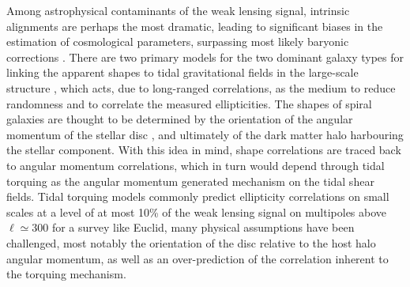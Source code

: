 \documentclass[a4paper,fleqn,usenatbib]{mnras}
\begin{document}
Among astrophysical contaminants of the weak lensing signal, intrinsic alignments \citep{jing_intrinsic_2002, mackey_theoretical_2002, heymans_weak_2004, altay_influence_2006, kirk_impact_2010, massey_origins_2013, kitching_limits_2016} are perhaps the most dramatic, leading to significant biases in the estimation of cosmological parameters, surpassing most likely baryonic corrections \citep{white_baryons_2004, semboloni_quantifying_2011}. There are two primary models for the two dominant galaxy types for linking the apparent shapes to tidal gravitational fields in the large-scale structure \citep{dubinski_cosmological_1992}, which acts, due to long-ranged correlations, as the medium to reduce randomness and to correlate the measured ellipticities. The shapes of spiral galaxies are thought to be determined by the orientation of the angular momentum of the stellar disc \citep{catelan_intrinsic_2001, crittenden_spin-induced_2001, bailin_internal_2005}, and ultimately of the dark matter halo harbouring the stellar component. With this idea in mind, shape correlations are traced back to angular momentum correlations, which in turn would depend through tidal torquing as the angular momentum generated mechanism on the tidal shear fields. Tidal torquing models commonly predict ellipticity correlations on small scales at a level of at most 10\% of the weak lensing signal on multipoles above $\ell\simeq300$ for a survey like Euclid, many physical assumptions have been challenged, most notably the orientation of the disc relative to the host halo angular momentum, as well as an over-prediction of the correlation inherent to the torquing mechanism.
\end{document}
